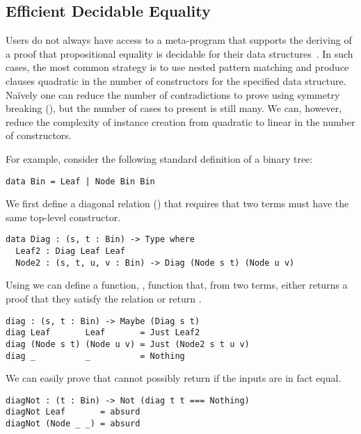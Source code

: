 \subsection{Efficient Decidable Equality}
\label{sec:idioms:decEq}

Users do not always have access to a meta-program that supports the deriving of a proof that propositional equality is decidable for their data structures~\cite{DBLP:conf/icfp/ChristiansenB16}.
%
In such cases, the most common strategy is to use nested pattern matching and produce
clauses quadratic in the number of constructors for the specified data structure.
%
Na{\"i}vely one can reduce the number of contradictions to prove using symmetry breaking (), but the number of cases to present is still many.
%
We can, however, reduce the complexity of  instance creation from quadratic to linear in the number of constructors.
%

For example, consider the following standard definition of a binary tree:

\begin{verbatim}
data Bin = Leaf | Node Bin Bin
\end{verbatim}

\noindent
We first define a diagonal relation () that requires that two terms must have the same top-level constructor.

\begin{verbatim}
data Diag : (s, t : Bin) -> Type where
  Leaf2 : Diag Leaf Leaf
  Node2 : (s, t, u, v : Bin) -> Diag (Node s t) (Node u v)
\end{verbatim}

\noindent
Using  we can define a function, , function that, from two terms, either returns a proof that they satisfy the  relation or return .

\begin{verbatim}
diag : (s, t : Bin) -> Maybe (Diag s t)
diag Leaf       Leaf       = Just Leaf2
diag (Node s t) (Node u v) = Just (Node2 s t u v)
diag _          _          = Nothing
\end{verbatim}

\noindent
We can easily prove that  cannot possibly return  if the inputs are in fact equal.

\begin{verbatim}
diagNot : (t : Bin) -> Not (diag t t === Nothing)
diagNot Leaf       = absurd
diagNot (Node _ _) = absurd
\end{verbatim}

